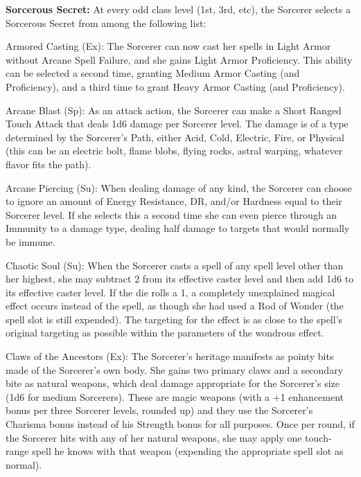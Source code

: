 \textbf{Sorcerous Secret:} At every odd class level (1st, 3rd, etc), the Sorcerer selects a Sorcerous Secret from among the following list:

\begin{description*}

\item[Armored Casting (Ex):] The Sorcerer can now cast her spells in Light Armor without Arcane Spell Failure, and she gains Light Armor Proficiency. This ability can be selected a second time, granting Medium Armor Casting (and Proficiency), and a third time to grant Heavy Armor Casting (and Proficiency).

\item[Arcane Blast (Sp):] As an attack action, the Sorcerer can make a Short Ranged Touch Attack that deals 1d6 damage per Sorcerer level. The damage is of a type determined by the Sorcerer's Path, either Acid, Cold, Electric, Fire, or Physical (this can be an electric bolt, flame blobs, flying rocks, astral warping, whatever flavor fits the path).

\item[Arcane Piercing (Su):] When dealing damage of any kind, the Sorcerer can choose to ignore an amount of Energy Resistance, DR, and/or Hardness equal to their Sorcerer level. If she selects this a second time she can even pierce through an Immunity to a damage type, dealing half damage to targets that would normally be immune.

\item[Chaotic Soul (Su):] When the Sorcerer casts a spell of any spell level other than her highest, she may subtract 2 from its effective caster level and then add 1d6 to its effective caster level. If the die rolls a 1, a completely unexplained magical effect occurs instead of the spell, as though she had used a Rod of Wonder (the spell slot is still expended). The targeting for the effect is as close to the spell's original targeting as possible within the parameters of the wondrous effect.

\item[Claws of the Ancestors (Ex):] The Sorcerer's heritage manifests as pointy bits made of the Sorcerer's own body. She gains two primary claws and a secondary bite as natural weapons, which deal damage appropriate for the Sorcerer's size (1d6 for medium Sorcerers). These are magic weapons (with a +1 enhancement bonus per three Sorcerer levels, rounded up) and they use the Sorcerer's Charisma bonus instead of his Strength bonus for all purposes. Once per round, if the Sorcerer hits with any of her natural weapons, she may apply one touch-range spell he knows with that weapon (expending the appropriate spell slot as normal).


\end{description*}
